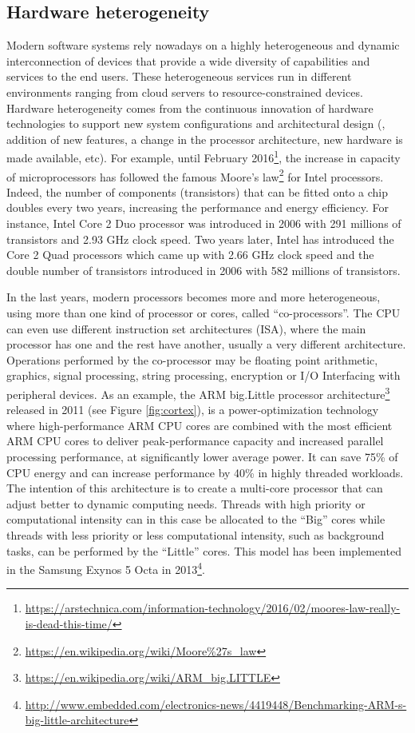 \subsection{Hardware heterogeneity}
\label{sec:Hardware diversity}
Modern software systems rely nowadays on a highly heterogeneous and dynamic interconnection of devices that provide a wide diversity of capabilities and services to the end users.
These heterogeneous services run in different environments ranging from cloud servers to resource-constrained devices.
Hardware heterogeneity comes from the continuous innovation of hardware technologies to support new system configurations and architectural design (\eg, addition of new features, a change in the processor architecture, new hardware is made available, etc). 
For example, until February 2016\footnote{\url{https://arstechnica.com/information-technology/2016/02/moores-law-really-is-dead-this-time/}}, the increase in capacity of microprocessors has followed the famous Moore's law\footnote{\url{https://en.wikipedia.org/wiki/Moore\%27s_law}} for Intel processors. Indeed, the number of components (transistors) that can be fitted onto a chip doubles every two years, increasing the performance and energy efficiency.
For instance, Intel Core 2 Duo processor was introduced in 2006 with 291 millions of transistors and 2.93 GHz clock speed. Two years later, Intel has introduced the Core 2 Quad processors which came up with 2.66 GHz clock speed and the double number of transistors introduced in 2006 with 582 millions of transistors.

In the last years, modern processors becomes more and more heterogeneous, using more than one kind of processor or cores, called ``co-processors''. The CPU can even use different instruction set architectures (ISA), where the main processor has one and the rest have another, usually a very different architecture. Operations performed by the co-processor may be floating point arithmetic, graphics, signal processing, string processing, encryption or I/O Interfacing with peripheral devices. 
As an example, the ARM big.Little processor architecture\footnote{\url{https://en.wikipedia.org/wiki/ARM_big.LITTLE}} released in 2011 (see Figure \ref{fig:cortex}), is a power-optimization technology where high-performance ARM CPU cores are combined with the most efficient ARM CPU cores to deliver peak-performance capacity and increased parallel processing performance, at significantly lower average power. It can save 75\% of CPU energy and can increase performance by 40\% in highly threaded workloads.
The intention of this architecture is to create a multi-core processor that can adjust better to dynamic computing needs.
Threads with high priority or computational intensity can in this case be allocated to the ``Big'' cores while threads with less priority or less computational intensity, such as background tasks, can be performed by the ``Little'' cores. This model has been implemented in the Samsung Exynos 5 Octa in 2013\footnote{\url{http://www.embedded.com/electronics-news/4419448/Benchmarking-ARM-s-big-little-architecture}}.


